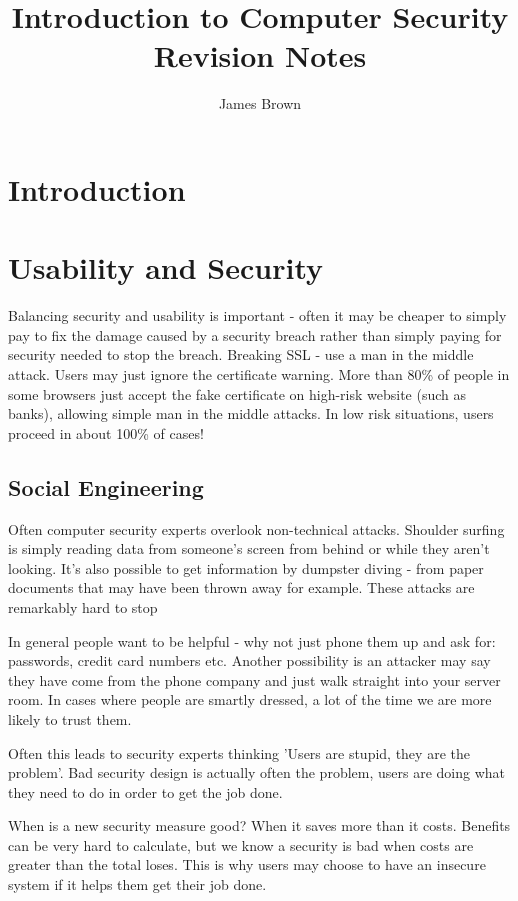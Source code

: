 \documentclass{article}
\title{Introduction to Computer Security \linebreak Revision Notes}
\author{James Brown}
\begin{document}
	\maketitle
	\newpage
	\tableofcontents
	\newpage

	\section{Introduction}
	
	\section{Usability and Security}
	Balancing security and usability is important - often it may be cheaper to simply pay to fix the damage caused by a security breach rather than simply paying for security needed to stop the breach.
	Breaking SSL - use a man in the middle attack. Users may just ignore the certificate warning. More than 80\% of people in some browsers just accept the fake certificate on high-risk website (such as banks), allowing simple man in the middle attacks. In low risk situations, users proceed in about 100\% of cases!
	
	\subsection{Social Engineering}
	Often computer security experts overlook non-technical attacks.
	Shoulder surfing is simply reading data from someone's screen from behind or while they aren't looking. It's also possible to get information by dumpster diving - from paper documents that may have been thrown away for example. These attacks are remarkably hard to stop
	
	\par 
	In general people want to be helpful - why not just phone them up and ask for: passwords, credit card numbers etc. Another possibility is an attacker may say they have come from the phone company and just walk straight into your server room. In cases where people are smartly dressed, a lot of the time we are more likely to trust them.
	
	\par Often this leads to security experts thinking 'Users are stupid, they are the problem'. Bad security design is actually often the problem, users are doing what they need to do in order to get the job done. 
	
	\par 
	When is a new security measure good? When it saves more than it costs. Benefits can be very hard to calculate, but we know a security is bad when costs are greater than the total loses. This is why users may choose to have an insecure system if it helps them get their job done.
	
\end{document}
